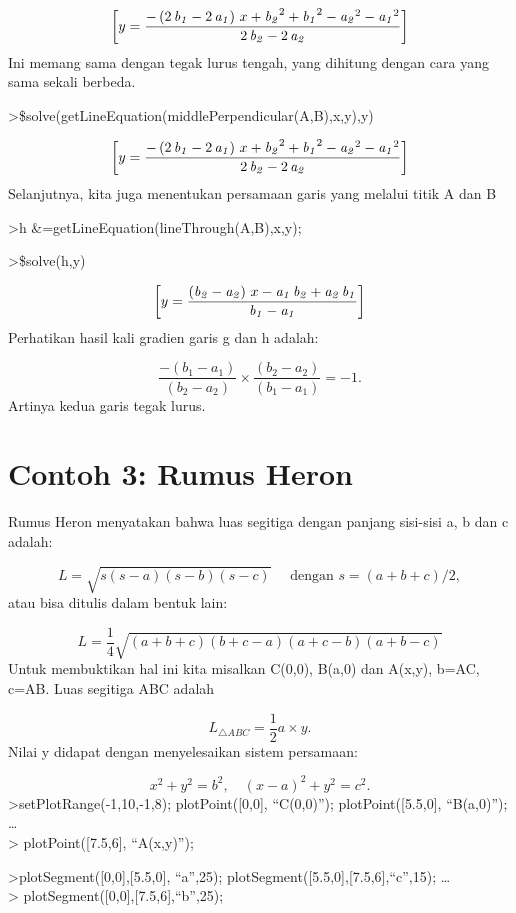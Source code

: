 \documentclass[
]{book}
\begin{document}
\[\left[ y=\frac{-\left(2\,{\it b_1}-2\,{\it a_1}\right)\,x+{\it b_2}  ^2+{\it b_1}^2-{\it a_2}^2-{\it a_1}^2}{2\,{\it b_2}-2\,{\it a_2}}   \right] \]Ini memang sama dengan tegak lurus tengah, yang dihitung dengan cara yang sama sekali berbeda.

\textgreater\$solve(getLineEquation(middlePerpendicular(A,B),x,y),y)

\[\left[ y=\frac{-\left(2\,{\it b_1}-2\,{\it a_1}\right)\,x+{\it b_2}  ^2+{\it b_1}^2-{\it a_2}^2-{\it a_1}^2}{2\,{\it b_2}-2\,{\it a_2}}   \right] \]Selanjutnya, kita juga menentukan persamaan garis yang melalui titik A dan B

\textgreater h \&=getLineEquation(lineThrough(A,B),x,y);

\textgreater\$solve(h,y)

\[\left[ y=\frac{\left({\it b_2}-{\it a_2}\right)\,x-{\it a_1}\,  {\it b_2}+{\it a_2}\,{\it b_1}}{{\it b_1}-{\it a_1}} \right] \]Perhatikan hasil kali gradien garis g dan h adalah:

\[\frac{-(b_1-a_1)}{(b_2-a_2)}\times \frac{(b_2-a_2)}{(b_1-a_1)} = -1.\]Artinya kedua garis tegak lurus.

\chapter{Contoh 3: Rumus Heron}\label{contoh-3-rumus-heron}

Rumus Heron menyatakan bahwa luas segitiga dengan panjang sisi-sisi a, b dan c adalah:

\[L = \sqrt{s(s-a)(s-b)(s-c)}\quad \text{ dengan } s=(a+b+c)/2,\]atau bisa ditulis dalam bentuk lain:

\[L = \frac{1}{4}\sqrt{(a+b+c)(b+c-a)(a+c-b)(a+b-c)}\]Untuk membuktikan hal ini kita misalkan C(0,0), B(a,0) dan A(x,y), b=AC, c=AB. Luas segitiga ABC adalah

\[L_{\triangle ABC}=\frac{1}{2}a\times y.\]Nilai y didapat dengan menyelesaikan sistem persamaan:

\[x^2+y^2=b^2, \quad (x-a)^2+y^2=c^2.\]\textgreater setPlotRange(-1,10,-1,8); plotPoint({[}0,0{]}, ``C(0,0)''); plotPoint({[}5.5,0{]}, ``B(a,0)''); \ldots{}\\
\textgreater{} plotPoint({[}7.5,6{]}, ``A(x,y)'');

\textgreater plotSegment({[}0,0{]},{[}5.5,0{]}, ``a'',25); plotSegment({[}5.5,0{]},{[}7.5,6{]},``c'',15); \ldots{}\\
\textgreater{} plotSegment({[}0,0{]},{[}7.5,6{]},``b'',25);
\end{document}
